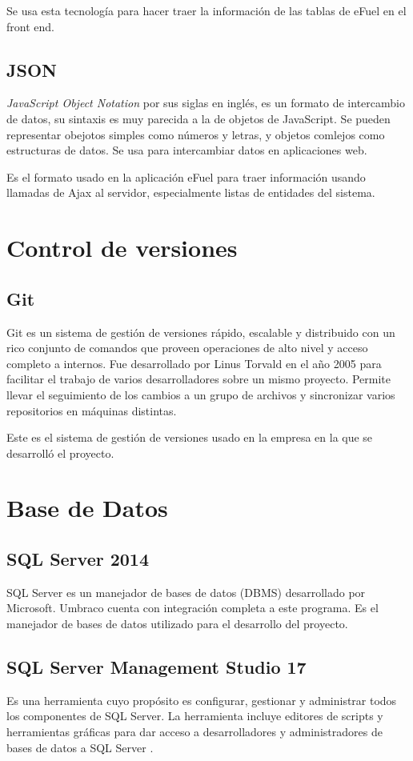 Se usa esta tecnología para hacer traer la información de las tablas de eFuel en el front end.

\subsection{JSON}
\emph{JavaScript Object Notation} por sus siglas en inglés, es un formato de intercambio de datos, su sintaxis es muy parecida a la de objetos de JavaScript. \cite{jsonMozilla} Se pueden representar obejotos simples como números y letras, y objetos comlejos como estructuras de datos. Se usa para intercambiar datos en aplicaciones web.

Es el formato usado en la aplicación eFuel para traer información usando llamadas de Ajax al servidor, especialmente listas de entidades del sistema.

\section{Control de versiones}
\subsection{Git}
Git es un sistema de gestión de versiones rápido, escalable y distribuido con un rico conjunto de comandos que proveen operaciones de alto nivel y acceso completo a internos. \cite{gitGit} Fue desarrollado por Linus Torvald en el año 2005 para facilitar el trabajo de varios desarrolladores sobre un mismo proyecto. Permite llevar el seguimiento de los cambios a un grupo de archivos y sincronizar varios repositorios en máquinas distintas.

Este es el sistema de gestión de versiones usado en la empresa en la que se desarrolló el proyecto.

\section{Base de Datos}
\subsection{SQL Server 2014}
SQL Server es un manejador de bases de datos (DBMS) desarrollado por Microsoft. Umbraco cuenta con integración completa a este programa. Es el manejador de bases de datos utilizado para el desarrollo del proyecto.

\subsection{SQL Server Management Studio 17}
Es una herramienta cuyo propósito es configurar, gestionar y administrar todos los componentes de SQL Server. La herramienta incluye editores de scripts y herramientas gráficas para dar acceso a desarrolladores y administradores de bases de datos a SQL Server \cite{SSMSMicrosoft}.

